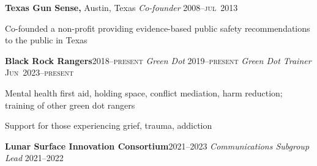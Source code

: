 \documentclass[12pt,letterpaper]{article}
\newenvironment{itemize*}%
{\begin{itemize}%
  \setlength{\itemsep}{0pt}}%
{\end{itemize}}
\newcommand{\rdate}[1]{{\hfill #1}}
\begin{document}
{\medskip
\textbf{Texas Gun Sense,} Austin, Texas \newline
\emph{Co-founder} \rdate{2008--\textsc{jul}~2013}
\begin{itemize*}
   \item Co-founded a non-profit providing evidence-based public safety recommendations to the public in Texas
\end{itemize*}


\medskip
\textbf{Black Rock Rangers}\rdate{2018--\textsc{present}}\newline
\emph{Green Dot} \rdate{2019--\textsc{present}} \newline
\emph{Green Dot Trainer} \rdate{\textsc{Jun}~2023--\textsc{present}}
\begin{itemize*}
  \item Mental health first aid, holding space, conflict mediation, harm reduction; training of other green dot rangers
  \item Support for those experiencing grief, trauma, addiction
\end{itemize*}

\medskip
\textbf{Lunar Surface Innovation Consortium}\rdate{2021--2023}\newline
\emph{Communications Subgroup Lead} \rdate{2021--2022}

}
\end{document}

